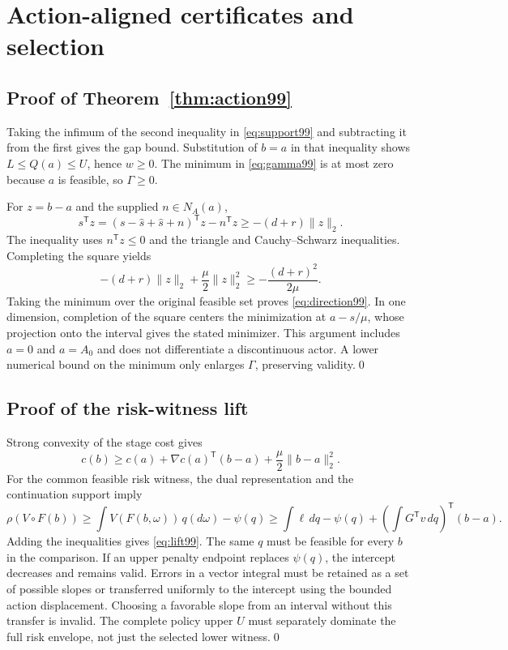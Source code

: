 \section{Action-aligned certificates and selection}\label{supp:action99}
\subsection{Proof of Theorem~\ref{thm:action99}}
Taking the infimum of the second inequality in \eqref{eq:support99} and subtracting it from the first gives the gap bound. Substitution of $b=a$ in that inequality shows $L\le Q(a)\le U$, hence $w\ge0$. The minimum in \eqref{eq:gamma99} is at most zero because $a$ is feasible, so $\Gamma\ge0$.

For $z=b-a$ and the supplied $n\in N_A(a)$,
\[
 s^{\mathsf T}z
 =(s-\widehat s+\widehat s+n)^{\mathsf T}z-n^{\mathsf T}z
 \ge -(d+r)\|z\|_2.
\]
The inequality uses $n^{\mathsf T}z\le0$ and the triangle and Cauchy--Schwarz inequalities. Completing the square yields
\[
 -(d+r)\|z\|_2+\frac\mu2\|z\|_2^2
 \ge -\frac{(d+r)^2}{2\mu}.
\]
Taking the minimum over the original feasible set proves \eqref{eq:direction99}. In one dimension, completion of the square centers the minimization at $a-s/\mu$, whose projection onto the interval gives the stated minimizer. This argument includes $a=0$ and $a=A_0$ and does not differentiate a discontinuous actor. A lower numerical bound on the minimum only enlarges $\Gamma$, preserving validity.\qed

\subsection{Proof of the risk-witness lift}
Strong convexity of the stage cost gives
\[
 c(b)\ge c(a)+\nabla c(a)^{\mathsf T}(b-a)+\frac\mu2\|b-a\|_2^2.
\]
For the common feasible risk witness, the dual representation and the continuation support imply
\[
 \rho(V\circ F(b))\ge\int V(F(b,\omega))\,q(d\omega)-\psi(q)
 \ge\int\ell\,dq-\psi(q)+\left(\int G^{\mathsf T}v\,dq\right)^{\!\mathsf T}(b-a).
\]
Adding the inequalities gives \eqref{eq:lift99}. The same $q$ must be feasible for every $b$ in the comparison. If an upper penalty endpoint replaces $\psi(q)$, the intercept decreases and remains valid. Errors in a vector integral must be retained as a set of possible slopes or transferred uniformly to the intercept using the bounded action displacement. Choosing a favorable slope from an interval without this transfer is invalid. The complete policy upper $U$ must separately dominate the full risk envelope, not just the selected lower witness.\qed

